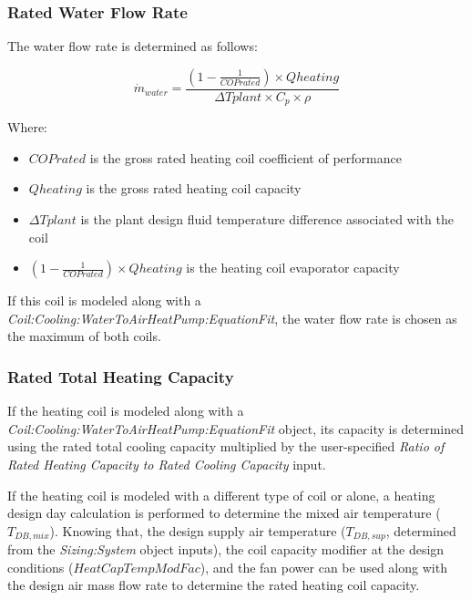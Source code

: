\subsubsection{Rated Water Flow Rate}\label{rated-water-flow-rate-2}

The water flow rate is determined as follows:

\begin{equation}
  \dot m_{water} = \frac{(1 - \frac{1}{COP{rated}}) \times Q{heating}}{\Delta T{plant} \times C_p \times \rho}
\end{equation}

Where:

\begin{itemize}
  \item
    ${COP{rated}}$ is the gross rated heating coil coefficient of performance
  \item
    $Q{heating}$ is the gross rated heating coil capacity
  \item
    $\Delta T{plant}$ is the plant design fluid temperature difference associated with the coil
  \item
    $(1 - \frac{1}{COP{rated}}) \times Q{heating}$ is the heating coil evaporator capacity
\end{itemize}


If this coil is modeled along with a \emph{Coil:Cooling:WaterToAirHeatPump:EquationFit}, the water flow rate is chosen as the maximum of both coils.

\subsubsection{Rated Total Heating Capacity}\label{rated-total-heating-capacity}

If the heating coil is modeled along with a \emph{Coil:Cooling:WaterToAirHeatPump:EquationFit} object, its capacity is determined using the rated total cooling capacity multiplied by the user-specified \emph{Ratio of Rated Heating Capacity to Rated Cooling Capacity} input.

If the heating coil is modeled with a different type of coil or alone, a heating design day calculation is performed to determine the mixed air temperature ($T_{DB,mix}$). Knowing that, the design supply air temperature ($T_{DB,sup}$, determined from the \emph{Sizing:System} object inputs), the coil capacity modifier at the design conditions ($HeatCapTempModFac$), and the fan power can be used along with the design air mass flow rate to determine the rated heating coil capacity.

